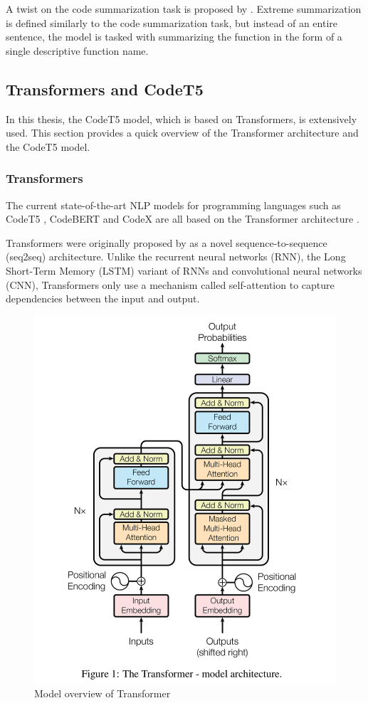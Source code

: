 A twist on the code summarization task is proposed by \citeauthor{ExtremeSummarization}. Extreme summarization is defined similarly to the code summarization task, but instead of an entire sentence, the model is tasked with summarizing the function in the form of a single descriptive function name.

\subsection{Transformers and CodeT5}
In this thesis, the CodeT5 model, which is based on Transformers, is extensively used. This section provides a quick overview of the Transformer architecture and the CodeT5 model.

\subsubsection{Transformers}
The current state-of-the-art NLP models for programming languages such as CodeT5 \cite{CodeT5}, CodeBERT \cite{CodeBERT} and CodeX \cite{CodeX} are all based on the Transformer architecture \cite{Transformers}.

Transformers were originally proposed by \citeauthor{Transformers} as a novel sequence-to-sequence (seq2seq) architecture. Unlike the recurrent neural networks (RNN), the Long Short-Term Memory (LSTM) variant of RNNs and convolutional neural networks (CNN), Transformers only use a mechanism called self-attention to capture dependencies between the input and output. 

\label{fig:transformers}
\begin{figure}[H]
  \centering
  \includegraphics[width=\linewidth]{img/transformer.png}
  \caption{Model overview of Transformer \cite{Transformers}}
\end{figure}

